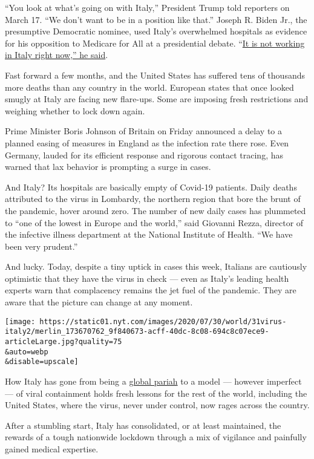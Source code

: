``You look at what's going on with Italy,'' President Trump told
reporters on March 17. ``We don't want to be in a position like that.''
Joseph R. Biden Jr., the presumptive Democratic nominee, used Italy's
overwhelmed hospitals as evidence for his opposition to Medicare for All
at a presidential debate.
``\href{https://edition.cnn.com/politics/live-news/2020-democratic-debate-live-updates/h_501d1e381370480bd021916a86029534}{It
is not working in Italy right now,'' he said}.

Fast forward a few months, and the United States has suffered tens of
thousands more deaths than any country in the world. European states
that once looked smugly at Italy are facing new flare-ups. Some are
imposing fresh restrictions and weighing whether to lock down again.

Prime Minister Boris Johnson of Britain on Friday announced a delay to a
planned easing of measures in England as the infection rate there rose.
Even Germany, lauded for its efficient response and rigorous contact
tracing, has warned that lax behavior is prompting a surge in cases.

And Italy? Its hospitals are basically empty of Covid-19 patients. Daily
deaths attributed to the virus in Lombardy, the northern region that
bore the brunt of the pandemic, hover around zero. The number of new
daily cases has plummeted to ``one of the lowest in Europe and the
world,'' said Giovanni Rezza, director of the infective illness
department at the National Institute of Health. ``We have been very
prudent.''

And lucky. Today, despite a tiny uptick in cases this week, Italians are
cautiously optimistic that they have the virus in check --- even as
Italy's leading health experts warn that complacency remains the jet
fuel of the pandemic. They are aware that the picture can change at any
moment.

\texttt{[image: https://static01.nyt.com/images/2020/07/30/world/31virus-italy2/merlin\_173670762\_9f840673-acff-40dc-8c08-694c8c07ece9-articleLarge.jpg?quality=75\\\&auto=webp\\\&disable=upscale]}

How Italy has gone from being a
\href{https://www.nytimes.com/2020/03/21/world/europe/italy-coronavirus-center-lessons.html}{global
pariah} to a model --- however imperfect --- of viral containment holds
fresh lessons for the rest of the world, including the United States,
where the virus, never under control, now rages across the country.

After a stumbling start, Italy has consolidated, or at least maintained,
the rewards of a tough nationwide lockdown through a mix of vigilance
and painfully gained medical expertise.

